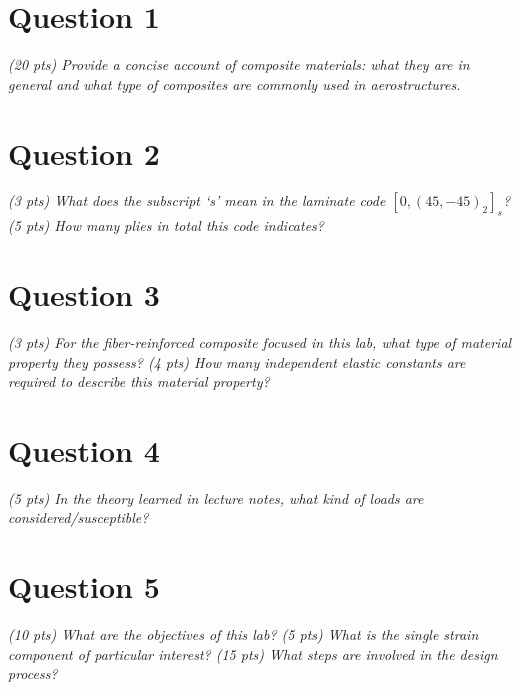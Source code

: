 \documentclass[12 pt]{article}
\begin{document}
\section*{Question 1} \label{question_1}
\textit{(\num{20} pts) Provide a concise account of composite materials: what they are in general and what type of composites are commonly used in aerostructures.}



\section*{Question 2} \label{question_2}
\textit{(\num{3} pts) What does the subscript `s' mean in the laminate code $[0,(45,-45)_2]_s$? (\num{5} pts) How many plies in total this code indicates?}



\section*{Question 3} \label{question_3}
\textit{(\num{3} pts) For the fiber-reinforced composite focused in this lab, what type of material property they possess? (\num{4} pts) How many independent elastic constants are required to describe this material property?}



\section*{Question 4} \label{question_4}
\textit{(\num{5} pts) In the theory learned in lecture notes, what kind of loads are considered/susceptible?}



\section*{Question 5} \label{question_5}
\textit{(\num{10} pts) What are the objectives of this lab? (\num{5} pts) What is the single strain component of particular interest? (\num{15} pts) What steps are involved in the design process?}
\end{document}

